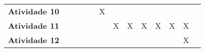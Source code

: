 \begin{table}[h!]
\begin{center}
\begin{small}
\begin{tabular}{p{5cm}cccccccccccc}
  \textbf{Atividade 10}          &             &             &             &             &      X      &             &             &             &             &             &             \\
  \textbf{Atividade 11}    &             &             &             &             &             &      X      &      X      &      X      &      X      &      X      &      X      \\
  \textbf{Atividade 12}     &             &             &             &             &             &             &             &             &             &             &      X      \\
  \bottomrule
\end{tabular}
\end{small}
\end{center}
\end{table}
